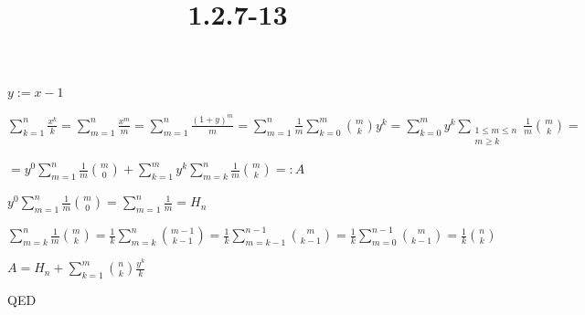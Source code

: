 \documentclass{article}
\title{1.2.7-13}
\begin{document}
\maketitle

$y := x - 1$

$\sum_{k=1}^n \frac{x^k}{k} = \sum_{m=1}^n \frac{x^m}{m} = \sum_{m=1}^n \frac{(1+y)^m}{m} = \sum_{m=1}^n \frac{1}{m} \sum_{k=0}^m \binom{m}{k} y^k = \sum_{k=0}^m y^k \sum_{\substack{1 \leq m \leq n\\m \geq k}} \frac{1}{m} \binom{m}{k} =$

$= y^0 \sum_{m=1}^n \frac{1}{m}\binom{m}{0} + \sum_{k=1}^m y^k \sum_{m=k}^n \frac{1}{m} \binom{m}{k} =: A$

$y^0 \sum_{m=1}^n \frac{1}{m}\binom{m}{0} = \sum_{m=1}^n \frac{1}{m} = H_n$

$\sum_{m=k}^n \frac{1}{m} \binom{m}{k} = \frac{1}{k} \sum_{m=k}^n \binom{m-1}{k-1} = \frac{1}{k} \sum_{m=k-1}^{n-1} \binom{m}{k-1} = \frac{1}{k} \sum_{m=0}^{n-1} \binom{m}{k-1} = \frac{1}{k} \binom{n}{k}$

$A = H_n + \sum_{k=1}^m \binom{n}{k}\frac{y^k}{k}$

QED
\end{document}
